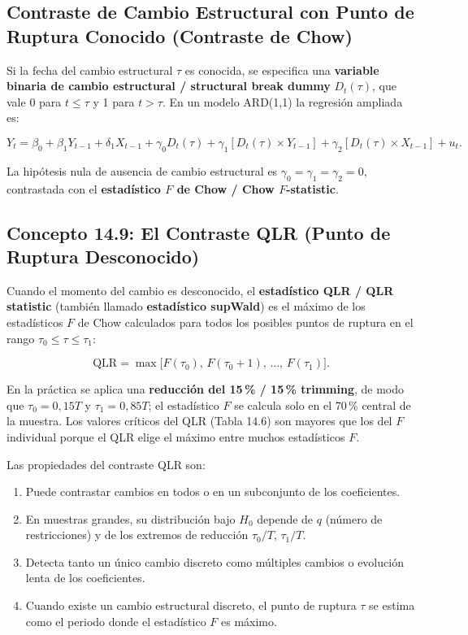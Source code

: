 \documentclass[12pt]{article}
\begin{document}
\subsection{Contraste de Cambio Estructural con Punto de Ruptura Conocido (Contraste de Chow)}

Si la fecha del cambio estructural $\tau$ es conocida, se especifica una \textbf{variable binaria de cambio estructural / structural break dummy} $D_t(\tau)$, que vale 0 para $t \leq \tau$ y 1 para $t > \tau$. En un modelo ARD(1,1) la regresi\'on ampliada es:

\begin{equation}
  Y_t = \beta_0 + \beta_1 Y_{t-1} + \delta_1 X_{t-1} + \gamma_0 D_t(\tau)
        + \gamma_1\!\left[D_t(\tau) \times Y_{t-1}\right]
        + \gamma_2\!\left[D_t(\tau) \times X_{t-1}\right] + u_t.
  \label{eq:chow}
\end{equation}

La hip\'otesis nula de ausencia de cambio estructural es $\gamma_0 = \gamma_1 = \gamma_2 = 0$, contrastada con el \textbf{estad\'istico $F$ de Chow / Chow $F$-statistic}.

\subsection{Concepto 14.9: El Contraste QLR (Punto de Ruptura Desconocido)}

Cuando el momento del cambio es desconocido, el \textbf{estad\'istico QLR / QLR statistic} (tambi\'en llamado \textbf{estad\'istico supWald}) es el m\'aximo de los estad\'isticos $F$ de Chow calculados para todos los posibles puntos de ruptura en el rango $\tau_0 \leq \tau \leq \tau_1$:

\begin{equation}
  \text{QLR} = \max\bigl[F(\tau_0),\, F(\tau_0+1),\, \ldots,\, F(\tau_1)\bigr].
  \label{eq:qlr}
\end{equation}

En la pr\'actica se aplica una \textbf{reducci\'on del 15\,\% / 15\,\% trimming}, de modo que $\tau_0 = 0{,}15T$ y $\tau_1 = 0{,}85T$; el estad\'istico $F$ se calcula solo en el 70\,\% central de la muestra. Los valores cr\'iticos del QLR (Tabla 14.6) son mayores que los del $F$ individual porque el QLR elige el m\'aximo entre muchos estad\'isticos $F$.

Las propiedades del contraste QLR son:
\begin{enumerate}
  \item Puede contrastar cambios en todos o en un subconjunto de los coeficientes.
  \item En muestras grandes, su distribuci\'on bajo $H_0$ depende de $q$ (n\'umero de restricciones) y de los extremos de reducci\'on $\tau_0/T$, $\tau_1/T$.
  \item Detecta tanto un \'unico cambio discreto como m\'ultiples cambios o evoluci\'on lenta de los coeficientes.
  \item Cuando existe un cambio estructural discreto, el punto de ruptura $\tau$ se estima como el periodo donde el estad\'istico $F$ es m\'aximo.
\end{enumerate}
\end{document}
